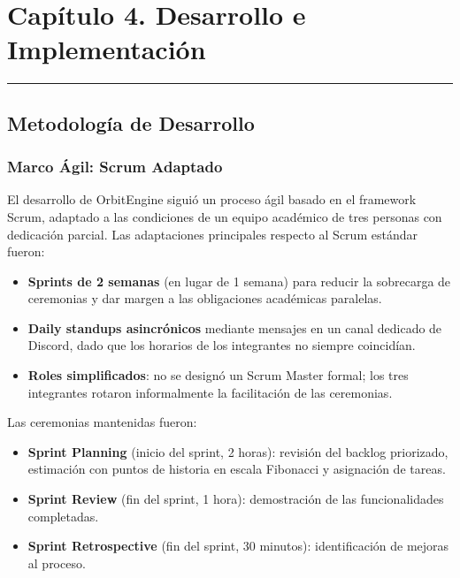 \chapter{Capítulo 4. Desarrollo e Implementación}\label{capuxedtulo-4.-desarrollo-e-implementaciuxf3n}

\begin{center}\rule{0.5\linewidth}{0.5pt}\end{center}

\section{Metodología de Desarrollo}\label{metodologuxeda-de-desarrollo}

\subsection{Marco Ágil: Scrum Adaptado}\label{marco-uxe1gil-scrum-adaptado}

El desarrollo de OrbitEngine siguió un proceso ágil basado en el framework Scrum, adaptado a las condiciones de un equipo académico de tres personas con dedicación parcial. Las adaptaciones principales respecto al Scrum estándar fueron:

\begin{itemize}
\tightlist
\item
  \textbf{Sprints de 2 semanas} (en lugar de 1 semana) para reducir la sobrecarga de ceremonias y dar margen a las obligaciones académicas paralelas.
\item
  \textbf{Daily standups asincrónicos} mediante mensajes en un canal dedicado de Discord, dado que los horarios de los integrantes no siempre coincidían.
\item
  \textbf{Roles simplificados}: no se designó un Scrum Master formal; los tres integrantes rotaron informalmente la facilitación de las ceremonias.
\end{itemize}

Las ceremonias mantenidas fueron:

\begin{itemize}
\tightlist
\item
  \textbf{Sprint Planning} (inicio del sprint, 2 horas): revisión del backlog priorizado, estimación con puntos de historia en escala Fibonacci y asignación de tareas.
\item
  \textbf{Sprint Review} (fin del sprint, 1 hora): demostración de las funcionalidades completadas.
\item
  \textbf{Sprint Retrospective} (fin del sprint, 30 minutos): identificación de mejoras al proceso.
\end{itemize}

